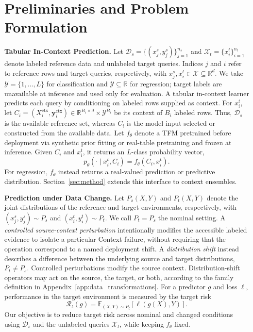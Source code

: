 \section{Preliminaries and Problem Formulation}
\label{sec:preliminaries}

\noindent\textbf{Tabular In-Context Prediction.}\label{sec:tabular_icl}
Let $\mathcal{D}_s=\{(x_j^s,y_j^s)\}_{j=1}^{n_s}$ and
$\mathcal{X}_t=\{x_i^t\}_{i=1}^{n_t}$ denote labeled reference data and
unlabeled target queries. Indices $j$ and $i$ refer to reference rows and
target queries, respectively, with $x_j^s,x_i^t\in\mathcal{X}\subseteq
\mathbb{R}^d$. We take $\mathcal{Y}=\{1,\ldots,L\}$ for classification and
$\mathcal{Y}\subseteq\mathbb{R}$ for regression; target labels are unavailable
at inference and used only for evaluation.
A tabular in-context learner predicts each query by conditioning on labeled
rows supplied as context. For $x_i^t$, let
$C_i=(X_i^{\mathrm{ctx}},\mathbf{y}_i^{\mathrm{ctx}})
\in\mathbb{R}^{B_i\times d}\times\mathcal{Y}^{B_i}$ be its context of $B_i$
labeled rows. Thus, $\mathcal{D}_s$ is the available reference set, whereas
$C_i$ is the model input selected or constructed from the available data.
Let $f_\theta$ denote a TFM pretrained before deployment via synthetic prior
fitting or real-table pretraining
\citep{hollmann2025tabpfn,qu2025tabicl,ma2025tabdpt} and frozen at inference.
Given $C_i$ and $x_i^t$, it returns an $L$-class probability vector,
\begin{equation}
  p_\theta(\cdot\mid x_i^t,C_i)=f_\theta(C_i,x_i^t).
  \label{eq:tfm_inference}
\end{equation}
For regression, $f_\theta$ instead returns a real-valued prediction or
predictive distribution. Section~\ref{sec:method} extends this interface to
context ensembles.

\noindent\textbf{Prediction under Data Change.}\label{sec:data_change}
Let $P_s(X,Y)$ and $P_t(X,Y)$ denote the joint distributions of the reference
and target environments, respectively, with
$(x_j^s,y_j^s)\sim P_s$ and $(x_i^t,y_i^t)\sim P_t$. We call $P_t=P_s$ the
nominal setting. A \emph{controlled source-context perturbation} intentionally
modifies the accessible labeled evidence to isolate a particular Context
failure, without requiring that the operation correspond to a named deployment
shift. A \emph{distribution shift} instead describes a difference between the
underlying source and target distributions, $P_t\neq P_s$. Controlled
perturbations modify the source context. Distribution-shift operators may act
on the source, the target, or both, according to the family definition in
Appendix~\ref{app:data_transformations}.
For a predictor $g$ and loss $\ell$, performance in the target environment is
measured by the target risk
\begin{equation}
  \mathcal{R}_t(g)
  =\mathbb{E}_{(X,Y)\sim P_t}\!\left[\ell\!\left(g(X),Y\right)\right].
  \label{eq:target_risk}
\end{equation}
Our objective is to reduce target risk across nominal and changed conditions
using $\mathcal D_s$ and the unlabeled queries $\mathcal X_t$, while keeping
$f_\theta$ fixed.
